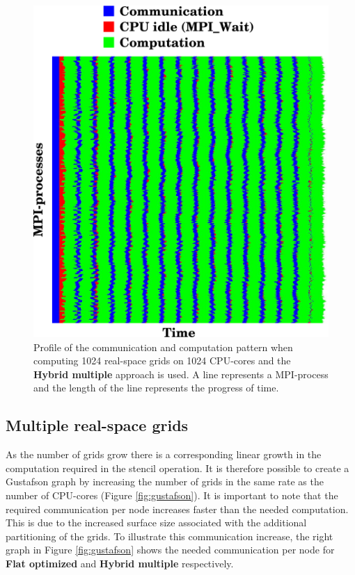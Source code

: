 \documentclass[preprint,3p,times,twocolumn]{elsarticle}
\begin{document}
\begin{figure}
 \centering
 \includegraphics[width=\linewidth]{gfx/prof}
 \caption{Profile of the communication and computation pattern when computing 1024 real-space grids on 1024 CPU-cores and the \textbf{Hybrid multiple} approach is used. A line represents a MPI-process and the length of the line represents the progress of time.}
 \label{fig:prof}
\end{figure}


\subsection{Multiple real-space grids}
As the number of grids grow there is a corresponding linear growth in the computation required in the stencil operation. It is therefore possible to create a Gustafson graph by increasing the number of grids in the same rate as the number of CPU-cores (Figure \ref{fig:gustafson}). It is important to note that the required communication per node increases faster than the needed computation. This is due to the increased surface size associated with the additional partitioning of the grids. To illustrate this communication increase, the right graph in Figure \ref{fig:gustafson} shows the needed communication per node for \textbf{Flat optimized} and \textbf{Hybrid multiple} respectively.
\end{document}
